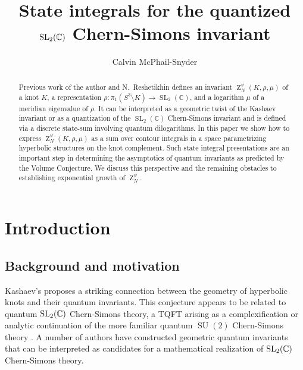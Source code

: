 \documentclass[margincite, leqno]{sl2art}
\title{State integrals for the quantized \(\operatorname{SL}_2(\mathbb{C})\) Chern-Simons invariant}
\author{Calvin McPhail-Snyder}
\numberwithin{equation}{section}
\begin{document}
\begin{abstract}
  Previous work of the author and N.\ Reshetikhin defines an
  invariant \(\operatorname{Z}_{N}^{\psi}(K, \rho, \mu)\) of a knot
  \(K\), a representation \(\rho \colon \pi_{1}(S^{3} \setminus K) \to
  \operatorname{SL}_{2}(\mathbb{C})\), and a logarithm \(\mu\) of a
  meridian eigenvalue of \(\rho\).
  It can be interpreted as a geometric twist of the Kashaev invariant
  or as a quantization of the \(\operatorname{SL}_{2}(\mathbb{C})\)
  Chern-Simons invariant and is defined via a discrete state-sum
  involving quantum dilogarithms.
  In this paper we show how to express
  \(\operatorname{Z}_{N}^{\psi}(K, \rho, \mu)\) as a sum over contour
  integrals in a space parametrizing hyperbolic structures on the
  knot complement.
  Such state integral presentations are an important step in
  determining the asymptotics of quantum invariants as predicted by
  the Volume Conjecture.
  We discuss this perspective and the remaining obstacles to
  establishing exponential growth of \(\operatorname{Z}_{N}^{\psi}\).
\end{abstract}


\maketitle


\section{Introduction}%
\label{sec:Introduction}

\subsection{Background and motivation}%
\label{sec:Background and motivation}

Kashaev's  \cite{Kashaev1997} proposes a
striking connection between the geometry of hyperbolic knots and
their quantum invariants.
This conjecture appears to be related to quantum \(\operatorname{SL}_2(\mathbb{C})\)
Chern-Simons theory, a TQFT arising as a complexification
\cite{Gukov2005} or analytic continuation \cite{Witten2010} of the
more familiar quantum \(\operatorname{SU}(2)\) Chern-Simons theory
\cite{zbMATH04092352}.
A number of authors
\cite{Baseilhac2004,Bonahon2021,Kashaev2005,McPhailSnyderVolume} have
constructed geometric quantum invariants that can be interpreted as
candidates for a mathematical realization of \(\operatorname{SL}_2(\mathbb{C})\) Chern-Simons theory.
\end{document}
